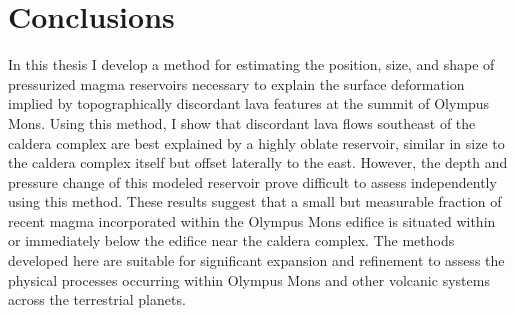 \chapter{Conclusions}

In this thesis I develop a method for estimating the position, size, and shape of pressurized magma reservoirs necessary to explain the surface deformation implied by topographically discordant lava features at the summit of Olympus Mons. Using this method, I show that discordant lava flows southeast of the caldera complex are best explained by a highly oblate reservoir, similar in size to the caldera complex itself but offset laterally to the east. However, the depth and pressure change of this modeled reservoir prove difficult to assess independently using this method. These results suggest that a small but measurable fraction of recent magma incorporated within the Olympus Mons edifice is situated within or immediately below the edifice near the caldera complex. The methods developed here are suitable for significant expansion and refinement to assess the physical processes occurring within Olympus Mons and other volcanic systems across the terrestrial planets.